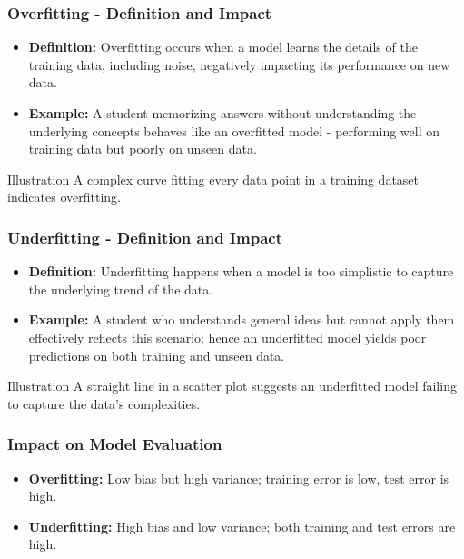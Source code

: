 \documentclass[aspectratio=169]{beamer}
\begin{document}
\begin{frame}[fragile]
    \frametitle{Overfitting - Definition and Impact}
    \begin{itemize}
        \item \textbf{Definition:} Overfitting occurs when a model learns the details of the training data, including noise, negatively impacting its performance on new data.
        \item \textbf{Example:} A student memorizing answers without understanding the underlying concepts behaves like an overfitted model - performing well on training data but poorly on unseen data.
    \end{itemize}
    
    \begin{block}{Illustration}
        A complex curve fitting every data point in a training dataset indicates overfitting.
    \end{block}
\end{frame}

\begin{frame}[fragile]
    \frametitle{Underfitting - Definition and Impact}
    \begin{itemize}
        \item \textbf{Definition:} Underfitting happens when a model is too simplistic to capture the underlying trend of the data.
        \item \textbf{Example:} A student who understands general ideas but cannot apply them effectively reflects this scenario; hence an underfitted model yields poor predictions on both training and unseen data.
    \end{itemize}
    
    \begin{block}{Illustration}
        A straight line in a scatter plot suggests an underfitted model failing to capture the data's complexities.
    \end{block}
\end{frame}

\begin{frame}[fragile]
    \frametitle{Impact on Model Evaluation}
    \begin{itemize}
        \item \textbf{Overfitting:} Low bias but high variance; training error is low, test error is high.
        \item \textbf{Underfitting:} High bias and low variance; both training and test errors are high.
    \end{itemize}
\end{frame}
\end{document}

